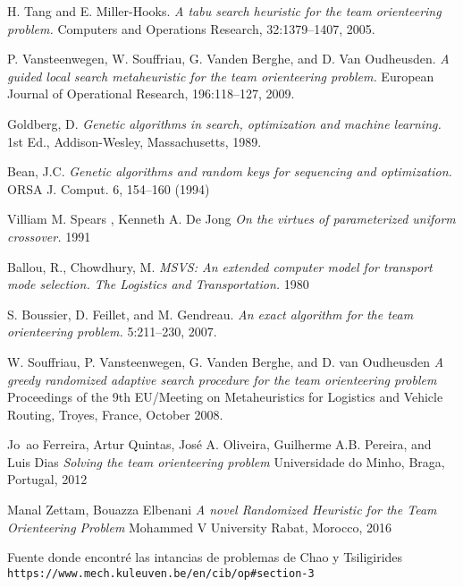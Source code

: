 \begin{thebibliography}{9}
H. Tang and E. Miller-Hooks.
\textit{A tabu search heuristic for the team orienteering problem.}
Computers and Operations Research, 32:1379–1407, 2005.

P. Vansteenwegen, W. Souffriau, G. Vanden Berghe, and D. Van Oudheusden.
\textit{A guided local search metaheuristic for the team orienteering problem.}
European Journal of Operational Research, 196:118–127, 2009.

Goldberg, D.
\textit{Genetic algorithms in search, optimization and machine learning.}
1st Ed., Addison-Wesley, Massachusetts, 1989.

Bean, J.C.
\textit{Genetic algorithms and random keys for sequencing and optimization.}
ORSA J. Comput. 6, 154–160 (1994)

Villiam M. Spears , Kenneth A. De Jong
\textit{On the virtues of parameterized uniform crossover.}
1991

Ballou, R., Chowdhury, M.
\textit{MSVS: An extended computer model for transport mode selection. The Logistics and Transportation.}
1980

S. Boussier, D. Feillet, and M. Gendreau.
\textit{An exact algorithm for the team orienteering problem.}
5:211–230, 2007.

W. Souffriau, P. Vansteenwegen, G. Vanden Berghe, and D. van Oudheusden
\textit{A greedy randomized adaptive search procedure for the team orienteering problem}
Proceedings of the 9th EU/Meeting on Metaheuristics for Logistics and Vehicle Routing, Troyes, France, October 2008.

Jo~ao Ferreira, Artur Quintas, José A. Oliveira, Guilherme A.B. Pereira, and Luis Dias
\textit{Solving the team orienteering problem}
Universidade do Minho, Braga, Portugal, 2012

Manal Zettam, Bouazza Elbenani
\textit{A novel Randomized Heuristic for the Team Orienteering Problem}
Mohammed V University Rabat, Morocco, 2016

Fuente donde encontré las intancias de problemas de Chao y Tsiligirides
\\\texttt{https://www.mech.kuleuven.be/en/cib/op\#section-3}

\end{thebibliography}